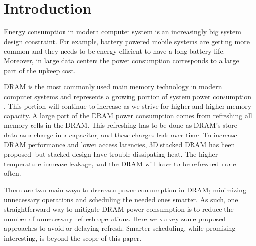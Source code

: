 \section{Introduction}
\label{sec:int}

Energy consumption in modern computer system is an increasingly big system design constraint. For example, battery powered mobile systems are getting more common and they needs to be energy efficient to have a long battery life. Moreover, in large data centers the power consumption corresponds to a large part of the upkeep cost. 

DRAM is the most commonly used main memory technology in modern computer systems and represents a growing portion of system power consumption \cite{exascale}. This portion will continue to increase as we strive for higher and higher memory capacity. A large part of the DRAM power consumption comes from refreshing all memory-cells in the DRAM. This refreshing has to be done as DRAM's store data as a charge in a capacitor, and these charges leak over time. To increase DRAM performance and lower access latencies, 3D stacked DRAM has been proposed, but stacked design have trouble dissipating heat. The higher temperature increase leakage, and the DRAM will have to be refreshed more often.

There are two main ways to decrease power consumption in DRAM; minimizing unnecessary operations and scheduling the needed ones smarter. As such, one straightforward way to mitigate DRAM power consumption is to reduce the number of unnecessary refresh operations. Here we survey some proposed approaches to avoid or delaying refresh. Smarter scheduling, while promising interesting, is beyond the scope of this paper.